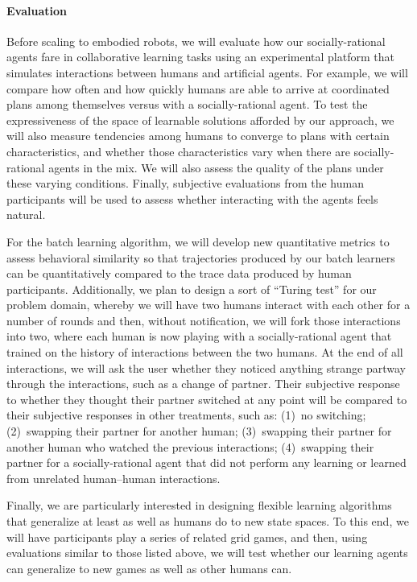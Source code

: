 
\vspace{\up}
\paragraph{Evaluation}

Before scaling to embodied robots,
we will evaluate how our socially-rational agents fare in
collaborative learning tasks using an experimental platform that
simulates interactions between humans and artificial agents.  For
example, we will compare how often and how quickly humans are able to
arrive at coordinated plans among themselves versus with a
socially-rational agent. To test the expressiveness of the space of
learnable solutions afforded by our approach, we will also measure
tendencies among humans to converge to plans with certain
characteristics, and whether those characteristics vary when there are
socially-rational agents in the mix.  We will also assess the quality of the
plans under these varying conditions.  Finally, subjective evaluations
from the human participants will be used to assess whether interacting
with the agents feels natural.

For the batch learning algorithm, we will develop new quantitative
metrics to assess behavioral similarity so that trajectories produced
by our batch learners can be quantitatively compared to the trace data
produced by human participants.  Additionally, we plan to design a
sort of ``Turing test'' for our problem domain, whereby we will have
two humans interact with each other for a number of rounds and then,
without notification, we will fork those interactions into two, where
each human is now playing with a socially-rational agent that trained
on the history of interactions between the two humans.  At the end of
all interactions, we will ask the user whether they noticed anything
strange partway through the interactions, such as a change of partner.
Their subjective response to whether they thought their partner
switched at any point will be compared to their subjective responses
in other treatments, such as: (1)~no switching; (2)~swapping their
partner for another human; (3)~swapping their partner for another
human who watched the previous interactions; (4)~swapping their
partner for a socially-rational agent that did not perform any
learning or learned from unrelated human--human interactions.

Finally, we are particularly interested in designing flexible learning
algorithms that generalize at least as well as humans do to new state
spaces.  To this end, we will have participants play a series of
related grid games, and then, using evaluations similar to those listed
above, we will test whether our learning agents can generalize to new
games as well as other humans can.  

